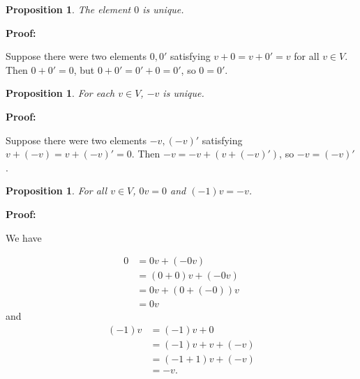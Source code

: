 \documentclass{article}
\theoremstyle{colontheorem}
\newtheorem{proposition}[theorem]{Proposition}
\newenvironment{Proposition}
{
	\begin{mdframed}[backgroundcolor=TheoremOrange!10]
	\begin{proposition}
}
{
	\end{proposition}
	\end{mdframed}
	
	\vspace{.15in}
}
\newenvironment{Proof}
{
	\vspace{-.3in}
	
	\begin{mdframed}[backgroundcolor=ProofPurple!10]
	\textbf{Proof:}%
}
{
	\end{mdframed}
	
	\vspace{.15in}
}
\begin{document}
\begin{Proposition}
	
	The element $0$ is unique.
	
\end{Proposition}



\begin{Proof}
	Suppose there were two elements $0, 0'$ satisfying $v + 0 = v + 0' = v$ for all $v \in V$. Then $0 + 0' = 0$, but $0 + 0' = 0' + 0 = 0'$, so $0 = 0'$. 
	
\end{Proof}




\begin{Proposition}
	
	For each $v \in V$, $-v$ is unique.
	
\end{Proposition}



\begin{Proof}
	Suppose there were two elements $-v, (-v)'$ satisfying $v + (-v) = v + (-v)' = 0$. Then $-v = -v + (v+(-v)')$, so $-v = (-v)'$.
	
\end{Proof}



\begin{Proposition}
	
	For all $v \in V$, $0v = 0$ and $(-1)v = -v$.
	
\end{Proposition}



\begin{Proof}
	We have 
	
	\begin{align*}
		0 &= 0v + (-0v)\\
		&= (0 + 0)v + (-0v)\\
		&= 0v + (0 + (-0))v\\
		&= 0v
	\end{align*} and \begin{align*}
		(-1)v &= (-1)v + 0\\
		&= (-1)v + v + (-v)\\
		&= (-1 + 1)v + (-v)\\
		&= -v.
	\end{align*}
	
\end{Proof}
\end{document}
